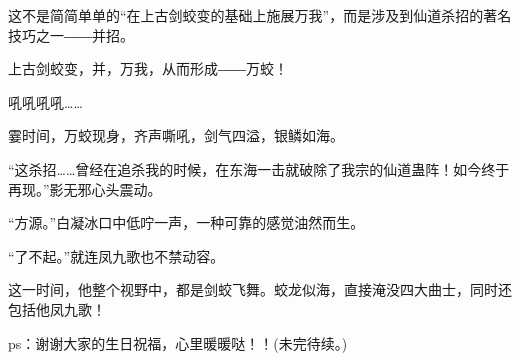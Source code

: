 \begin{this_body}
这不是简简单单的“在上古剑蛟变的基础上施展万我”，而是涉及到仙道杀招的著名技巧之一――并招。

上古剑蛟变，并，万我，从而形成――万蛟！

吼吼吼吼……

霎时间，万蛟现身，齐声嘶吼，剑气四溢，银鳞如海。

“这杀招……曾经在追杀我的时候，在东海一击就破除了我宗的仙道蛊阵！如今终于再现。”影无邪心头震动。

“方源。”白凝冰口中低咛一声，一种可靠的感觉油然而生。

“了不起。”就连凤九歌也不禁动容。

这一时间，他整个视野中，都是剑蛟飞舞。蛟龙似海，直接淹没四大曲士，同时还包括他凤九歌！

ps：谢谢大家的生日祝福，心里暖暖哒！！(未完待续。)

\end{this_body}


